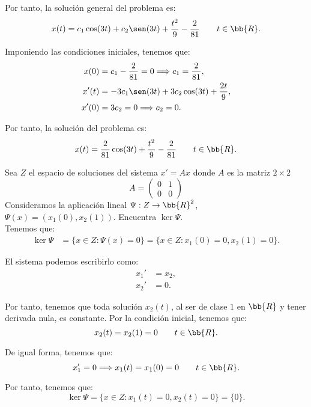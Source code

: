 \documentclass[12pt]{article}
\begin{document}
\begin{ejercicio}
        Por tanto, la solución general del problema es:
        \[
            x(t) = c_1\cos(3t) + c_2\sen(3t) + \frac{t^2}{9} - \frac{2}{81}\qquad t\in \bb{R}.
        \]

        Imponiendo las condiciones iniciales, tenemos que:
        \begin{align*}
            x(0) &= c_1 - \frac{2}{81} = 0 \Longrightarrow c_1 = \frac{2}{81}, \\
            x'(t) &= -3c_1\sen(3t) + 3c_2\cos(3t) + \frac{2t}{9}, \\
            x'(0) &= 3c_2 = 0 \Longrightarrow c_2 = 0.
        \end{align*}

        Por tanto, la solución del problema es:
        \[
            x(t) = \frac{2}{81}\cos(3t) + \frac{t^2}{9} - \frac{2}{81}\qquad t\in \bb{R}.
        \]
    \end{ejercicio}

    \begin{ejercicio}
        Sea $Z$ el espacio de soluciones del sistema $x' = Ax$ donde $A$ es la matriz $2\times 2$
        \[
            A=\begin{pmatrix}
                0 & 1 \\
                0 & 0
            \end{pmatrix}
        \]
        Consideramos la aplicación lineal $\Psi : Z \to \bb{R}^2$, $\Psi(x) = (x_1(0), x_2(1))$. Encuentra $\ker \Psi$.\\

        Tenemos que:
        \begin{align*}
            \ker \Psi &= \{x\in Z : \Psi(x) = 0\}
            = \{x\in Z : x_1(0) = 0, x_2(1) = 0\}.
        \end{align*}

        El sistema podemos escribirlo como:
        \begin{align*}
            x_1' &= x_2, \\
            x_2' &= 0.
        \end{align*}

        Por tanto, tenemos que toda solución $x_2(t)$, al ser de clase $1$ en $\bb{R}$ y tener derivada nula, es constante. Por la condición inicial, tenemos que:
        \[
            x_2(t) = x_2(1) = 0\qquad t\in \bb{R}.
        \]

        De igual forma, tenemos que:
        \begin{equation*}
            x_1'=0\Longrightarrow
            x_1(t)=x_1(0)=0\qquad t\in \bb{R}.
        \end{equation*}

        Por tanto, tenemos que:
        \[
            \ker \Psi = \{x\in Z : x_1(t) = 0, x_2(t) = 0\} = \{0\}.
        \]
    \end{ejercicio}
\end{document}
